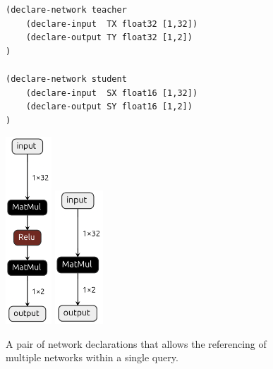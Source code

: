 \begin{figure}[h!]
    \begin{minipage}[c]{0.64\textwidth}
        \begin{lstlisting}[style=lbnf]
(declare-network teacher
    (declare-input  TX float32 [1,32])
    (declare-output TY float32 [1,2])
)

(declare-network student
    (declare-input  SX float16 [1,32])
    (declare-output SY float16 [1,2])
)\end{lstlisting}
    \end{minipage}
    \begin{minipage}[c]{0.35\textwidth}
        \centering
        \includegraphics[height=7cm]{imgs/teacher_net.onnx.png}
        \vspace{0.5cm} 
        \includegraphics[height=5cm]{imgs/student_net.onnx.png}
    \end{minipage}
    \caption{A pair of \vnnlib{} network declarations that allows the referencing of multiple networks within a single query.}
    \label{fig:multiple-networks}
\end{figure}

